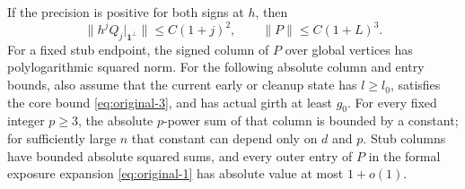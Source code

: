 \begin{lemma}
\label{lemma:pencil-coefficients}
If the precision is positive for both signs at $h$, then
\begin{equation}
 \|h^jQ_j|_{\mathbf1^\perp}\|\le C(1+j)^2,
 \qquad \|P\|\le C(1+L)^3.
 \label{eq:original-7}
\end{equation}
For a fixed stub endpoint, the signed column of $P$ over global
vertices has polylogarithmic squared norm.
For the following absolute column and entry bounds, also assume that
the current early or cleanup state has $l\ge l_0$, satisfies the core
bound \eqref{eq:original-3}, and has actual girth at least $g_0$.
For every fixed integer $p\ge3$, the absolute $p$-power sum of that
column is bounded by a constant; for
sufficiently large $n$ that constant can depend only on $d$ and $p$.
Stub columns have bounded absolute squared sums, and every outer
entry of $P$ in the formal exposure expansion \eqref{eq:original-1} has absolute
value at most $1+o(1)$.
\end{lemma}

